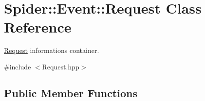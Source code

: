 \hypertarget{class_spider_1_1_event_1_1_request}{}\section{Spider\+:\+:Event\+:\+:Request Class Reference}
\label{class_spider_1_1_event_1_1_request}


\hyperlink{class_spider_1_1_event_1_1_request}{Request} informations container.  




{\ttfamily \#include $<$Request.\+hpp$>$}

\subsection*{Public Member Functions}
